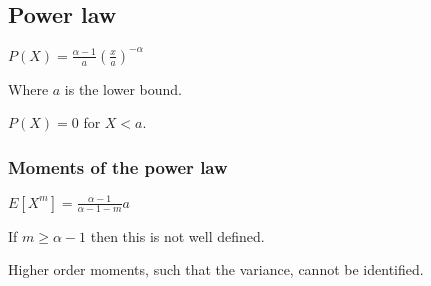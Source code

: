 
\subsection{Power law}

\(P(X)=\frac{\alpha -1}{a}(\frac{x}{a})^{-\alpha }\)

Where \(a\) is the lower bound.

\(P(X)=0\) for \(X<a\).

\subsubsection{Moments of the power law}

\(E[X^m]=\frac{\alpha - 1}{\alpha -1 -m }a\)

If \(m\ge \alpha -1 \) then this is not well defined.

Higher order moments, such that the variance, cannot be identified.

